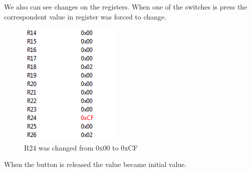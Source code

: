 \documentclass[english]{article}
\begin{document}
We also can see changes on the registers. When one of the switches is press the correspondent value in register was forced to change.
\begin{figure}[H]
\centerline{\includegraphics[scale=0.8]{MicroLab3/swithc_pressed}}
\caption{R24 was changed from 0x00 to 0xCF}
\end{figure}
When the button is released the value became initial value.
\end{document}
